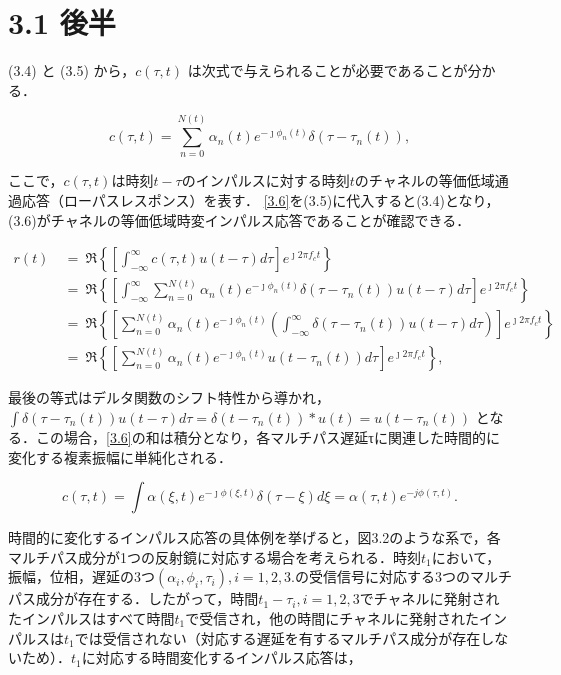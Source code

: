 \documentclass[dvipdfmx]{jsarticle}
\begin{document}
\section*{3.1 後半}
(3.4) と (3.5) から，$c(\tau, t)$ は次式で与えられることが必要であることが分かる．

\begin{equation}\label{3.6}
c(\tau, t) = \sum_{n=0}^{N(t)} \alpha_n (t) e^{- \jmath \phi_n (t)} \delta(\tau - \tau_n (t)), \tag{3.6}
\end{equation}

\noindent
ここで，$c(\tau, t)$は時刻$t - \tau$のインパルスに対する時刻$t$のチャネルの等価低域通過応答（ローパスレスポンス）を表す．
\eqref{3.6}を(3.5)に代入すると(3.4)となり，(3.6)がチャネルの等価低域時変インパルス応答であることが確認できる．

\begin{align*}\label{}
r(t) \ &= \ \Re \left\{ \left[ \int_{-\infty}^\infty c(\tau, t) u(t - \tau)d\tau \right] e^{\jmath 2 \pi f_c t} \right\} \\
       &= \ \Re \left\{ \left[ \int_{-\infty}^\infty \sum_{n=0}^{N(t)} \alpha_n (t) e^{- \jmath \phi_n (t)} \delta(\tau - \tau_n (t)) u(t - \tau)d\tau \right] e^{\jmath 2 \pi f_c t} \right\} \\
       &= \ \Re \left\{ \left[ \sum_{n=0}^{N(t)} \alpha_n (t) e^{- \jmath \phi_n (t)} \left( \int_{-\infty}^\infty \delta(\tau - \tau_n (t)) u(t - \tau)d\tau \right) \right] e^{\jmath 2 \pi f_c t} \right\} \\
       &= \ \Re \left\{ \left[ \sum_{n=0}^{N(t)} \alpha_n (t) e^{- \jmath \phi_n (t)} u(t - \tau_n (t))d\tau \right] e^{\jmath 2 \pi f_c t} \right\},
\end{align*}

\noindent
最後の等式はデルタ関数のシフト特性から導かれ，
$\int \delta(\tau - \tau_n (t))u(t - \tau )d\tau = δ(t - \tau_n (t))*u(t) = u(t-\tau_n (t))$ となる．この場合，\eqref{3.6}の和は積分となり，各マルチパス遅延τに関連した時間的に変化する複素振幅に単純化される．

\begin{equation}\label{3.7}
c(\tau, t) = \int \alpha (\xi, t) e^{- \jmath \phi (\xi, t)} \delta(\tau - \xi) d\xi = \alpha(\tau, t)e^{-j\phi(\tau, t)}. \tag{3.7}
\end{equation}

\noindent
時間的に変化するインパルス応答の具体例を挙げると，図3.2のような系で，各マルチパス成分が1つの反射鏡に対応する場合を考えられる．時刻$t_1$において，振幅，位相，遅延の3つ$(\alpha_i, \phi_i, \tau_i), i = 1, 2, 3.$の受信信号に対応する3つのマルチパス成分が存在する．したがって，時間$t_1- \tau_i, i = 1, 2, 3$でチャネルに発射されたインパルスはすべて時間$t_1$で受信され，他の時間にチャネルに発射されたインパルスは$t_1$では受信されない（対応する遅延を有するマルチパス成分が存在しないため）．$t_1$に対応する時間変化するインパルス応答は，
\end{document}
